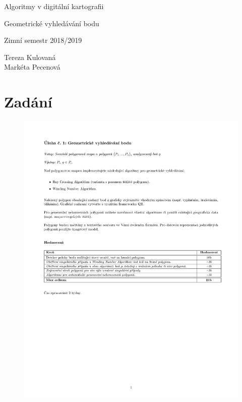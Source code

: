 \documentclass[a4paper, 12pt]{article}
\begin{document}
\begin{titlepage}
\begin{center}
\Huge
\vspace*{4.5cm}
Algoritmy v digitální kartografii \\
\vspace{0.2cm}

\Large  
Geometrické vyhledávání bodu\\
\vspace{0.2cm}

\normalsize  
Zimní semestr 2018/2019\\
\vspace{14cm}
\end{center}

\begin{flushright}
\Large
Tereza Kulovaná \\
Markéta Pecenová \\
\end{flushright}

\end{titlepage}


\pagestyle{plain}     %
\setcounter{page}{1}  %

\tableofcontents
\newpage

\section{Zadání}
\begin{figure}[h!]
	\includegraphics[clip, trim=0cm 10cm 0cm 3cm, width=1.0\textwidth]{./pictures/zadani.pdf}
\end{figure}
\end{document}
